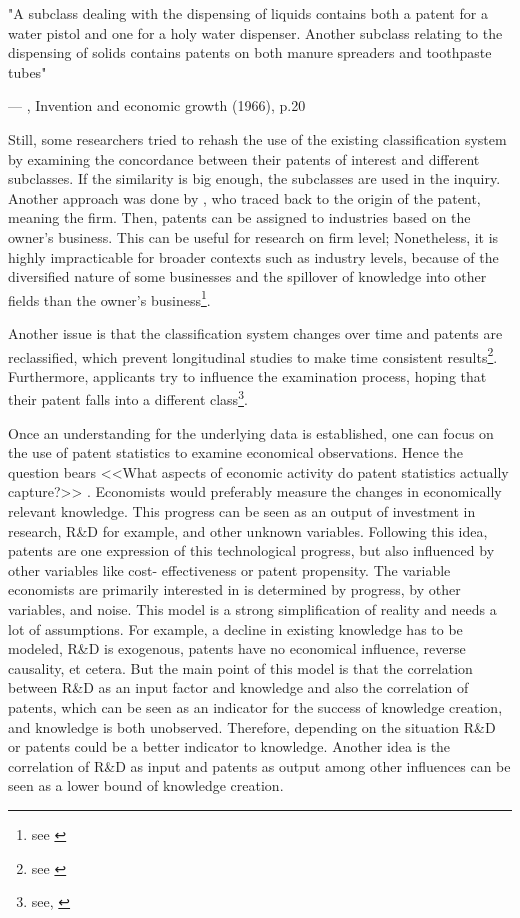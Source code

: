 \documentclass[12pt, a4paper]{scrartcl}
\theoremstyle{definition}
\begin{document}
\epigraph{"A subclass dealing with the dispensing of liquids contains both a
patent for a water pistol and one for a holy water dispenser. Another subclass
relating to the dispensing of solids contains patents on both manure spreaders
and toothpaste tubes"}{--- \textup{\citeauthor{schmookler1966invention}},
Invention and economic growth (1966), p.20}

Still, some researchers tried to rehash the use of the existing classification
system by examining the concordance between their patents of interest and
different subclasses. If the similarity is big enough, the subclasses are used
in the inquiry. Another approach was done by \citeauthor{hall2001nber}, who
traced back to the origin of the patent, meaning the firm. Then, patents can be
assigned to industries based on the owner's business. This can be useful for
research on firm level; Nonetheless, it is highly impracticable for broader
contexts such as industry levels, because of the diversified nature of some
businesses and the spillover of knowledge into other fields than the owner's
business\footnote{see \cite{griliches1990patent}}.

Another issue is that the classification system changes over time and patents
are reclassified, which prevent longitudinal studies to make time consistent
results\footnote{see \citet{bessen2007empirical}}. Furthermore, applicants try
to influence the examination process, hoping that their patent falls into a
different class\footnote{see, \citet[p.21]{lerner2006new}}.

Once an understanding for the underlying data is established, one can focus on
the use of patent statistics to examine economical observations. Hence the
question bears <<What aspects of economic activity do patent statistics
actually capture?>> \citep[p. 296]{griliches1990patent}. Economists would
preferably measure the changes in economically relevant knowledge. This
progress can be seen as an output of investment in research, R\&D for example,
and other unknown variables. Following this idea, patents are one expression of
this technological progress, but also influenced by other variables like cost-
effectiveness or patent propensity. The variable economists are primarily
interested in is determined by progress, by other variables, and noise. This
model is a strong simplification of reality and needs a lot of assumptions. For
example, a decline in existing knowledge has to be modeled, R\&D is exogenous,
patents have no economical influence, reverse causality, et cetera. But the
main point of this model is that the correlation between R\&D as an input
factor and knowledge and also the correlation of patents, which can be seen as
an indicator for the success of knowledge creation, and knowledge is both
unobserved. Therefore, depending on the situation R\&D or patents could be a
better indicator to knowledge. Another idea is the correlation of R\&D as input
and patents as output among other influences can be seen as a lower bound of
knowledge creation.
\end{document}
